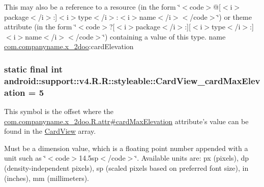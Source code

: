 This may also be a reference to a resource (in the form \char`\"{}$<$code$>$@\mbox{[}$<$i$>$package$<$/i$>$:\mbox{]}$<$i$>$type$<$/i$>$:$<$i$>$name$<$/i$>$$<$/code$>$\char`\"{}) or theme attribute (in the form \char`\"{}$<$code$>$?\mbox{[}$<$i$>$package$<$/i$>$:\mbox{]}\mbox{[}$<$i$>$type$<$/i$>$:\mbox{]}$<$i$>$name$<$/i$>$$<$/code$>$\char`\"{}) containing a value of this type.  name \hyperlink{namespacecom_1_1companyname_1_1x__2doo}{com.companyname.x\_\-2doo}:cardElevation \hypertarget{classandroid_1_1support_1_1v4_1_1_r_1_1styleable_7e06403a899e01eae19c14aae1ee38cc}{
\subsubsection[{CardView\_\-cardMaxElevation}]{\setlength{\rightskip}{0pt plus 5cm}static final int android::support::v4.R.R::styleable::CardView\_\-cardMaxElevation = 5}}
\label{classandroid_1_1support_1_1v4_1_1_r_1_1styleable_7e06403a899e01eae19c14aae1ee38cc}


This symbol is the offset where the \hyperlink{classcom_1_1companyname_1_1x__2doo_1_1_r_1_1attr_bd9f7dee965db0b4fd87b4336bc771a3}{com.companyname.x\_\-2doo.R.attr\#cardMaxElevation} attribute's value can be found in the \hyperlink{classandroid_1_1support_1_1v4_1_1_r_1_1styleable_4fcc6453aa91deadd7072add3aee5e56}{CardView} array.

Must be a dimension value, which is a floating point number appended with a unit such as \char`\"{}$<$code$>$14.5sp$<$/code$>$\char`\"{}. Available units are: px (pixels), dp (density-independent pixels), sp (scaled pixels based on preferred font size), in (inches), mm (millimeters). 

